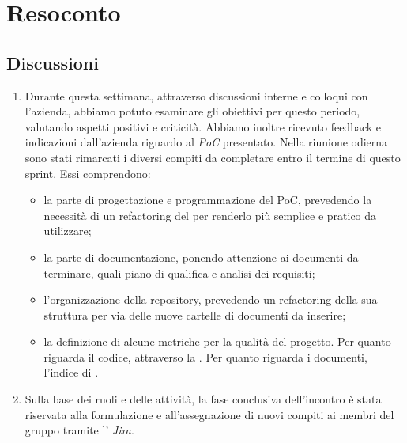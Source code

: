 \section{Resoconto} \label{sec:resoconto}
\subsection{Discussioni} \label{subsec:resdiscussione}
\begin{enumerate}
    \item Durante questa settimana, attraverso discussioni interne e colloqui con l'azienda, abbiamo potuto esaminare gli obiettivi per questo periodo, valutando aspetti positivi e criticità. Abbiamo inoltre ricevuto feedback e indicazioni dall'azienda riguardo al \emph{PoC} presentato. Nella riunione odierna sono stati rimarcati i diversi compiti da completare entro il termine di questo sprint. Essi comprendono: 
    \begin{itemize}
        \item la parte di progettazione e programmazione del PoC, prevedendo la necessità di un refactoring del  per renderlo più semplice e pratico da utilizzare; 
        \item la parte di documentazione, ponendo attenzione ai documenti da terminare, quali piano di qualifica e analisi dei requisiti;
        \item l'organizzazione della repository, prevedendo un refactoring della sua struttura per via delle nuove cartelle di documenti da inserire;
        \item la definizione di alcune metriche per la qualità del progetto. Per quanto riguarda il codice, attraverso la . Per quanto riguarda i documenti, l’indice di .
     \end{itemize}

    \item Sulla base dei ruoli e delle attività, la fase conclusiva dell'incontro è stata riservata alla formulazione e all'assegnazione di nuovi compiti ai membri del gruppo tramite l' \emph{Jira}.

\end{enumerate}


